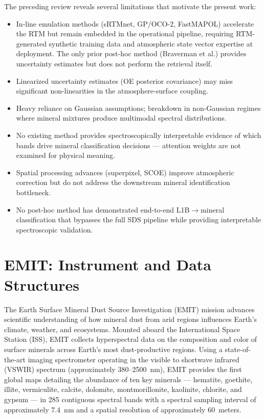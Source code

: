 \documentclass[11pt]{report}
\begin{document}
The preceding review reveals several limitations that motivate the present work:
\begin{itemize}
  \item In-line emulation methods (sRTMnet, GP/OCO-2, FastMAPOL) accelerate the RTM but remain embedded in the operational pipeline, requiring RTM-generated synthetic training data and atmospheric state vector expertise at deployment. The only prior post-hoc method (Braverman et al.) provides uncertainty estimates but does not perform the retrieval itself.
  \item Linearized uncertainty estimates (OE posterior covariance) may miss significant non-linearities in the atmosphere-surface coupling.
  \item Heavy reliance on Gaussian assumptions; breakdown in non-Gaussian regimes where mineral mixtures produce multimodal spectral distributions.
  \item No existing method provides spectroscopically interpretable evidence of which bands drive mineral classification decisions --- attention weights are not examined for physical meaning.
  \item Spatial processing advances (superpixel, SCOE) improve atmospheric correction but do not address the downstream mineral identification bottleneck.
  \item No post-hoc method has demonstrated end-to-end L1B$\rightarrow$mineral classification that bypasses the full SDS pipeline while providing interpretable spectroscopic validation.
\end{itemize}


\chapter{EMIT: Instrument and Data Structures}
\label{chap:emit}

The Earth Surface Mineral Dust Source Investigation (EMIT) mission advances scientific understanding of how mineral dust from arid regions influences Earth’s climate, weather, and ecosystems. Mounted aboard the International Space Station (ISS), EMIT collects hyperspectral data on the composition and color of surface minerals across Earth’s most dust-productive regions. Using a state-of-the-art imaging spectrometer operating in the visible to shortwave infrared (VSWIR) spectrum (approximately 380--2500~nm), EMIT provides the first global maps detailing the abundance of ten key minerals --- hematite, goethite, illite, vermiculite, calcite, dolomite, montmorillonite, kaolinite, chlorite, and gypsum --- in 285 contiguous spectral bands with a spectral sampling interval of approximately 7.4~nm and a spatial resolution of approximately 60~meters.
\end{document}
